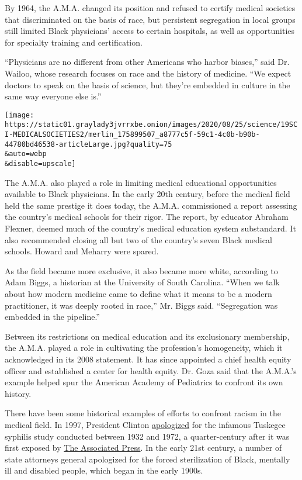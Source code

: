 By 1964, the A.M.A. changed its position and refused to certify medical
societies that discriminated on the basis of race, but persistent
segregation in local groups still limited Black physicians' access to
certain hospitals, as well as opportunities for specialty training and
certification.

``Physicians are no different from other Americans who harbor biases,''
said Dr. Wailoo, whose research focuses on race and the history of
medicine. ``We expect doctors to speak on the basis of science, but
they're embedded in culture in the same way everyone else is.''

\texttt{[image: https://static01.graylady3jvrrxbe.onion/images/2020/08/25/science/19SCI-MEDICALSOCIETIES2/merlin\_175899507\_a8777c5f-59c1-4c0b-b90b-44780bd46538-articleLarge.jpg?quality=75\\\&auto=webp\\\&disable=upscale]}

The A.M.A. also played a role in limiting medical educational
opportunities available to Black physicians. In the early 20th century,
before the medical field held the same prestige it does today, the
A.M.A. commissioned a report assessing the country's medical schools for
their rigor. The report, by educator Abraham Flexner, deemed much of the
country's medical education system substandard. It also recommended
closing all but two of the country's seven Black medical schools. Howard
and Meharry were spared.

As the field became more exclusive, it also became more white, according
to Adam Biggs, a historian at the University of South Carolina. ``When
we talk about how modern medicine came to define what it means to be a
modern practitioner, it was deeply rooted in race,'' Mr. Biggs said.
``Segregation was embedded in the pipeline.''

Between its restrictions on medical education and its exclusionary
membership, the A.M.A. played a role in cultivating the profession's
homogeneity, which it acknowledged in its 2008 statement. It has since
appointed a chief health equity officer and established a center for
health equity. Dr. Goza said that the A.M.A.'s example helped spur the
American Academy of Pediatrics to confront its own history.

There have been some historical examples of efforts to confront racism
in the medical field. In 1997, President Clinton
\href{https://www.cdc.gov/tuskegee/clintonp.htm}{apologized} for the
infamous Tuskegee syphilis study conducted between 1932 and 1972, a
quarter-century after it was first exposed by
\href{https://apnews.com/e9dd07eaa4e74052878a68132cd3803a/AP-WAS-THERE:-Black-men-untreated-in-Tuskegee-Syphilis-Study}{The
Associated Press}. In the early 21st century, a number of state
attorneys general apologized for the forced sterilization of Black,
mentally ill and disabled people, which began in the early 1900s.

